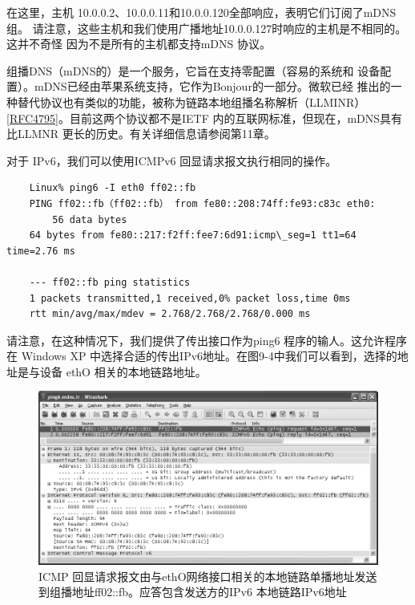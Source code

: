 在这里，主机 10.0.0.2、10.0.0.11和10.0.0.120全部响应，表明它们订阅了mDNS组。
请注意，这些主机和我们使用广播地址10.0.0.127时响应的主机是不相同的。这并不奇怪
因为不是所有的主机都支持mDNS 协议。

\begin{tcolorbox}
    组播DNS（mDNS的）是一个服务，它旨在支持零配置（容易的系统和
    设备配置）。mDNS已经由苹果系统支持，它作为Bonjour的一部分。微软已经
    推出的一种替代协议也有类似的功能，被称为链路本地组播名称解析（LLMINR）
    \href{https://www.rfc-editor.org/rfc/rfc4795}{[RFC4795]}。目前这两个协议都不是IETF 内的互联网标准，但现在，mDNS具有
    比LLMNR 更长的历史。有关详细信息请参阅第11章。
\end{tcolorbox}

对于 IPv6，我们可以使用ICMPv6 回显请求报文执行相同的操作。

\begin{verbatim}
    Linux% ping6 -I eth0 ff02::fb
    PING ff02::fb（ff02::fb） from fe80::208:74ff:fe93:c83c eth0:
        56 data bytes
    64 bytes from fe80::217:f2ff:fee7:6d91:icmp\_seg=1 tt1=64 time=2.76 ms

    --- ff02::fb ping statistics
    1 packets transmitted,1 received,0% packet loss,time 0ms
    rtt min/avg/max/mdev = 2.768/2.768/2.768/0.000 ms
\end{verbatim}

请注意，在这种情况下，我们提供了传出接口作为ping6 程序的输人。这允许程序在
Windows XP 中选择合适的传出IPv6地址。在图9-4中我们可以看到，选择的地址是与设备
ethO 相关的本地链路地址。

\begin{figure}[ht]
    \centering
	\includegraphics[width=1\textwidth]{imgs/9/9-4.png}
	\caption{ICMP 回显请求报文由与ethO网络接口相关的本地链路单播地址发送到组播地址ff02::fb。应答包含发送方的IPv6 本地链路IPv6地址}
\end{figure}


